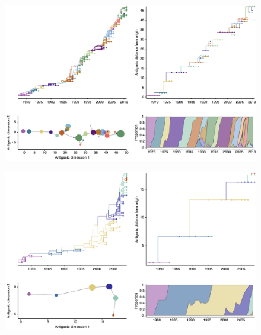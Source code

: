 \documentclass[11pt,oneside,letterpaper]{article}
\begin{document}
\begin{figure}[h]
	\centering		
	\includegraphics[width=1\textwidth]{figures/custom/h3n2_dynamics}
	
	\label{H3N2tree} 
\end{figure}


\begin{figure}[h]
	\centering		
	\includegraphics[width=1\textwidth]{figures/custom/h1n1_dynamics}

	\label{H1N1tree} 
\end{figure}
\end{document}
